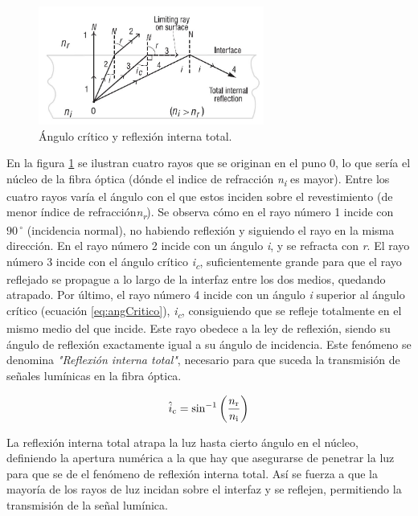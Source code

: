 \begin{itemize}
 \begin{figure}[H]
 	\centering
 	\includegraphics[width=0.66\textwidth]{./img/TIR}
 	\caption{Ángulo crítico y reflexión interna total. \cite{geometriaBasicaFP} } 
 	\label{fig:TIR}
 \end{figure}
 
 En la figura \ref{fig:TIR} se ilustran cuatro rayos que se originan en el puno 0, lo que sería el núcleo de la fibra óptica (dónde el indice de refracción \textit{n\textsubscript{i}} es mayor). Entre los cuatro rayos varía el ángulo con el que estos inciden sobre el revestimiento (de menor índice de refracción\textit{n\textsubscript{r}}). Se observa cómo en el rayo número 1 incide con $90\,^{\circ}$ (incidencia normal), no habiendo reflexión y siguiendo el rayo en la misma dirección. En el rayo número 2 incide con un ángulo \textit{i}, y se refracta con \textit{r}. El rayo número 3 incide con el ángulo crítico \textit{i\textsubscript{c}}, suficientemente grande para que el rayo reflejado se propague a lo largo de la interfaz entre los dos medios, quedando atrapado. Por último, el rayo número 4 incide con un ángulo \textit{i} superior al ángulo crítico (ecuación \ref{eq:angCritico}), \textit{i\textsubscript{c}}, consiguiendo que se refleje totalmente en el mismo medio del que incide. Este rayo obedece a la ley de reflexión, siendo su ángulo de reflexión exactamente igual a su ángulo de incidencia. Este fenómeno se denomina \textit{"Reflexión interna total"}, necesario para que suceda la transmisión de señales lumínicas en la fibra óptica. 

	\begin{equation}
		\label{eq:angCritico}
		\hat{i}\textsubscript{c} =  \sin^{-1}\left(\dfrac{n\textsubscript{r}}{n\textsubscript{i}}\right)
	\end{equation}

 La reflexión interna total atrapa la luz hasta cierto ángulo en el núcleo, definiendo la apertura numérica a la que hay que asegurarse de penetrar la luz para que se de el fenómeno de reflexión interna total. Así se fuerza a que la mayoría de los rayos de luz incidan sobre el interfaz y se reflejen, permitiendo la transmisión de la señal lumínica. 
 


\end{itemize}
